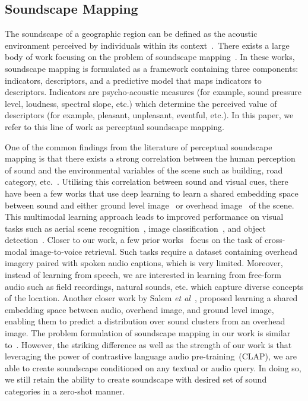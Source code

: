 \documentclass{bmvc2k}
\def\etal{\emph{et al}\bmvaOneDot}
\begin{document}
\subsection{Soundscape Mapping}
The soundscape of a geographic region can be defined as the acoustic environment perceived by individuals within its context~\cite{international2014iso}.~There exists a large body of work focusing on the problem of soundscape mapping~\cite{aiello2016chatty,lionello2020systematic,picaut2019open,margaritis2017soundscape,aramaki2023image,engel2021review,gonzalez2023effects,ooi2023araus,zhao2023sensing,yue2023visualized}. In these works, soundscape mapping is formulated as a framework containing three components: indicators, descriptors, and a predictive model that maps indicators to descriptors. Indicators are psycho-acoustic measures (for example, sound pressure level, loudness, spectral slope, etc.) which determine the perceived value of descriptors (for example, pleasant, unpleasant, eventful, etc.). In this paper, we refer to this line of work as perceptual soundscape mapping.

One of the common findings from the literature of perceptual soundscape mapping is that there exists a strong correlation between the human perception of sound and the environmental variables of the scene such as building, road category, etc.~\cite{garzon2023relationships}. Utilising this correlation between sound and visual cues, there have been a few works that use deep learning to learn a shared embedding space between sound and either ground level image~\cite{owens2016ambient} or overhead image~\cite{hu2020cross} of the scene. This multimodal learning approach leads to improved performance on visual tasks such as aerial scene recognition~\cite{hu2020cross}, image classification~\cite{owens2016ambient}, and object detection~\cite{owens2016ambient}. Closer to our work, a few prior works~\cite{mao2018deep,chen2020deep,ning2021semantics, yang2022multimodal} focus on the task of cross-modal image-to-voice retrieval. Such tasks require a dataset containing overhead imagery paired with spoken audio captions, which is very limited. Moreover, instead of learning from speech, we are interested in learning from free-form audio such as field recordings, natural sounds, etc. which capture diverse concepts of the location. Another closer work by Salem \etal~\cite{salem2018multimodal}, proposed learning a shared embedding space between audio, overhead image, and ground level image, enabling them to predict a distribution over sound clusters from an overhead image. The problem formulation of soundscape mapping in our work is similar to~\cite{salem2018multimodal}. However, the striking difference as well as the strength of our work is that leveraging the power of contrastive language audio pre-training~(CLAP), we are able to create  soundscape conditioned on any textual or audio query. In doing so, we still retain the ability to create soundscape with desired set of sound categories in a zero-shot manner. 
\end{document}
